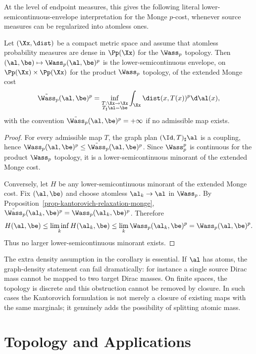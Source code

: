 At the level of endpoint measures, this gives the following literal lower-semicontinuous-envelope interpretation for the Monge $p$-cost, whenever source measures can be regularized into atomless ones.

\begin{cor}\label{cor-wasserstein-lsc-envelope-monge-distance}
		Let $(\Xx,\dist)$ be a compact metric space and assume that atomless probability measures are dense in $\Pp(\Xx)$ for the $\Wass_p$ topology. Then $(\al,\be)\mapsto\Wass_p(\al,\be)^p$ is the lower-semicontinuous envelope, on $\Pp(\Xx)\times\Pp(\Xx)$ for the product $\Wass_p$ topology, of the extended Monge cost
	\[
		\tilde\Wass_p(\al,\be)^p
		=
		\inf_{\substack{T:\Xx\to\Xx\\ T_\sharp\al=\be}}
		\int_\Xx \dist(x,T(x))^p\d\al(x),
	\]
	with the convention $\tilde\Wass_p(\al,\be)^p=+\infty$ if no admissible map exists.
\end{cor}
\begin{proof}
	For every admissible map $T$, the graph plan $(\Id,T)_\sharp\al$ is a coupling, hence $\Wass_p(\al,\be)^p\leq \tilde\Wass_p(\al,\be)^p$. Since $\Wass_p^p$ is continuous for the product $\Wass_p$ topology, it is a lower-semicontinuous minorant of the extended Monge cost.

	Conversely, let $H$ be any lower-semicontinuous minorant of the extended Monge cost. Fix $(\al,\be)$ and choose atomless $\al_k\to\al$ in $\Wass_p$. By Proposition~\ref{prop-kantorovich-relaxation-monge}, $\tilde\Wass_p(\al_k,\be)^p=\Wass_p(\al_k,\be)^p$. Therefore
	\[
		H(\al,\be)
		\leq
		\liminf_k H(\al_k,\be)
		\leq
		\lim_k \Wass_p(\al_k,\be)^p
		=
		\Wass_p(\al,\be)^p.
	\]
	Thus no larger lower-semicontinuous minorant exists.
\end{proof}

The extra density assumption in the corollary is essential. If $\al$ has atoms, the graph-density statement can fail dramatically: for instance a single source Dirac mass cannot be mapped to two target Dirac masses. On finite spaces, the topology is discrete and this obstruction cannot be removed by closure. In such cases the Kantorovich formulation is not merely a closure of existing maps with the same marginals; it genuinely adds the possibility of splitting atomic mass.


\section{Topology and Applications}
\label{sec-wasserstein-topology-applications}


